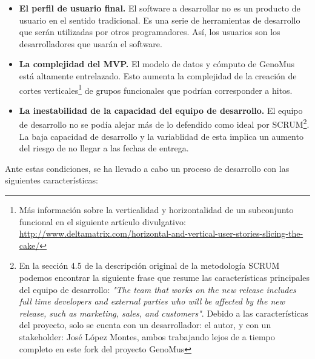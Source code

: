 \begin{itemize}
    \item \textbf{El perfil de usuario final.} El software a desarrollar no es un producto de usuario en el sentido tradicional. Es una serie de herramientas de desarrollo que serán utilizadas por otros programadores. Así, los usuarios son los desarrolladores que usarán el software.

    \item \textbf{La complejidad del MVP.} El modelo de datos y cómputo de GenoMus está altamente entrelazado. Esto aumenta la complejidad de la creación de cortes verticales\footnote{Más información sobre la verticalidad y horizontalidad de un subconjunto funcional en el siguiente artículo divulgativo: \url{http://www.deltamatrix.com/horizontal-and-vertical-user-stories-slicing-the-cake/}} de grupos funcionales que podrían corresponder a hitos.
    
    \item \textbf{La inestabilidad de la capacidad del equipo de desarrollo.} El equipo de desarrollo no se podía alejar más de lo defendido como ideal por SCRUM\footnote{En la sección 4.5 de la descripción original de la metodología SCRUM\cite{scrum} podemos encontrar la siguiente frase que resume las características principales del equipo de desarrollo: \textit{"The team that works on the new release includes full time developers and external parties who will be affected by the new release, such as marketing, sales, and customers"}. Debido a las características del proyecto, solo se cuenta con un desarrollador: el autor, y con un stakeholder: José López Montes, ambos trabajando lejos de a tiempo completo en este fork del proyecto GenoMus}. La baja capacidad de desarrollo y la variablidad de esta implica un aumento del riesgo de no llegar a las fechas de entrega.
\end{itemize}

Ante estas condiciones, se ha llevado a cabo un proceso de desarrollo con las siguientes características:

